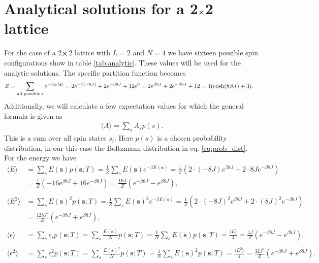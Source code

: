 \documentclass[english,notitlepage,reprint,nofootinbib]{revtex4-1}  %
\begin{document}
\section{Analytical solutions for a 2$\cross$2 lattice}\label{appendix:A}
For the case of a 2$\cross$2 lattice with $L=2$ and $N=4$ we have sixteen possible spin configurations show in table \ref{tab:analytic}. These values will be used for the analytic solutions. The specific partition function becomes
\begin{align*}
    Z &=  \sum_{\text{all possible \textbf{s}}} e^{- \beta E(\textbf{s})} 
    = 2e^{- \beta (-8J)} + 2e^{- \beta 8J} + 12e^0 
    = 2 e^{\beta 8J} + 2 e^{- \beta 8J} + 12 
    = 4 (\cosh(8 \beta J) + 3).
\end{align*}
Additionally, we will calculate a few expectation values for which the general formula is given as
\begin{align*}
    \langle A \rangle = \sum_s A_s p(s).
\end{align*}
This is a sum over all spin states $s_i$. Here $p(s)$ is a chosen probability distribution, in our this case the Boltzmann distribution in eq. \ref{eq:prob_dist}. For the energy we have
\begin{align*}
    \langle E \rangle &=  \sum_s E(\textbf{s})  p(\textbf{s};T) 
    = \frac{1}{Z} \sum_s E(\textbf{s})  e^{-\beta E(\textbf{s})} 
    = \frac{1}{Z} \left( 2 \cdot (-8J)e^{\beta8J} + 2 \cdot 8J e^{-\beta 8J}\right) \\
    &= \frac{1}{Z} \left( -16 e^{\beta8J} + 16 e^{-\beta 8J}\right)
    = \frac{16J}{Z} \left( e^{-\beta 8J} - e^{\beta 8J} \right),
\\
\\
    \langle E^2 \rangle &=  \sum_s E(\textbf{s})^2  p(\textbf{s};T)
    = \frac{1}{Z} \sum_s E(\textbf{s})^2  e^{-\beta E(\textbf{s})} 
    = \frac{1}{Z} \left( 2 \cdot (-8J)^2e^{\beta8J} + 2 \cdot (8J)^2 e^{-\beta 8J}\right) \\
    &= \frac{128 J^2}{Z} \left( e^{-\beta 8J} + e^{\beta 8J} \right),
\\
\\
    \langle \epsilon \rangle &=  \sum_s \epsilon_s  p(\textbf{s};T)
    =  \sum_s \frac{E(\textbf{s})}{N}  p(\textbf{s};T)
    =  \frac{1}{N} \sum_s E(\textbf{s})  p(\textbf{s};T)
    =  \frac{\langle E \rangle }{4}
    = \frac{4J}{Z} \left( e^{-\beta 8J} - e^{\beta 8J} \right),
\\
\\
    \langle \epsilon^2 \rangle &=  \sum_s \epsilon_s^2  p(\textbf{s};T)
    =  \sum_s \frac{E(\textbf{s})^2}{N}  p(\textbf{s};T)
    =  \frac{1}{N} \sum_s E(\textbf{s})^2  p(\textbf{s};T)
    =  \frac{\langle E^2 \rangle }{4}
    = \frac{32 J^2}{Z} \left( e^{-\beta 8J} + e^{\beta 8J} \right).
\end{align*}
\end{document}
